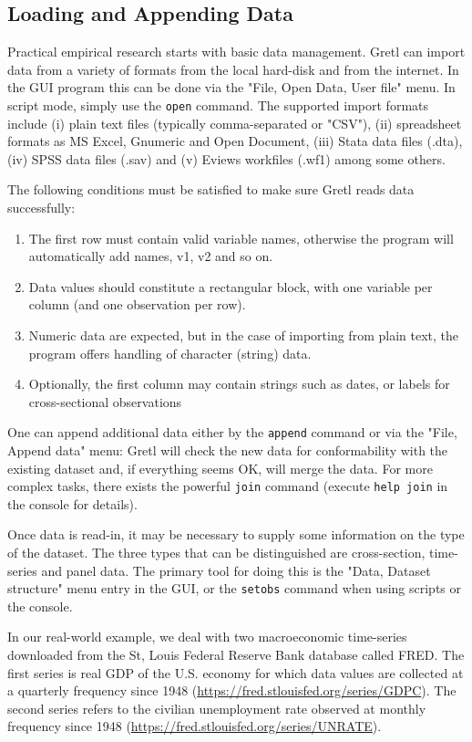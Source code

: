 \documentclass[11pt]{article}
\begin{document}
\subsection{Loading and Appending Data}
\label{sec:dataloadappend}
Practical empirical research starts with basic data management. Gretl can import data from a variety of formats from the local hard-disk and from the internet. In the GUI program this can be done via the "File, Open Data, User file" menu. In script mode, simply use the \texttt{open} command. The supported import formats include (i) plain text files (typically comma-separated or "CSV"), (ii) spreadsheet formats as MS Excel, Gnumeric and Open Document, (iii) Stata data files (.dta), (iv) SPSS data files (.sav) and (v) Eviews workfiles (.wf1) among some others.

The following conditions must be satisfied to make sure Gretl reads data successfully:
\begin{enumerate}
	\item The first row must contain valid variable names, otherwise the program will automatically add names, v1, v2 and so on.
	\item Data values should constitute a rectangular block, with one variable per column (and one observation per row).
	\item Numeric data are expected, but in	the case of importing from plain text, the program offers handling of character (string) data.
	\item Optionally, the first column may contain strings such as	dates, or labels for cross-sectional observations
\end{enumerate}

One can append additional data either by the \texttt{append} command or via the "File, Append data" menu: Gretl will check the
new data for conformability with the existing dataset and, if everything seems OK, will merge the data. For more complex tasks, there exists the powerful \texttt{join} command (execute \texttt{help join} in the console for details).

Once data is read-in, it may be necessary to supply some information on the type of the dataset. The three types that can be distinguished are cross-section, time-series and panel data. The primary tool for doing this is the "Data, Dataset structure" menu entry in the GUI, or the \texttt{setobs} command when using scripts or the console.

In our real-world example, we deal with two macroeconomic time-series downloaded from the St, Louis Federal Reserve Bank database called FRED. %
The first series is real GDP of the U.S. economy for which data values are collected at a quarterly frequency since 1948 (\url{https://fred.stlouisfed.org/series/GDPC}). The second series refers to the civilian unemployment rate observed at monthly frequency since 1948 (\url{https://fred.stlouisfed.org/series/UNRATE}).
\end{document}
